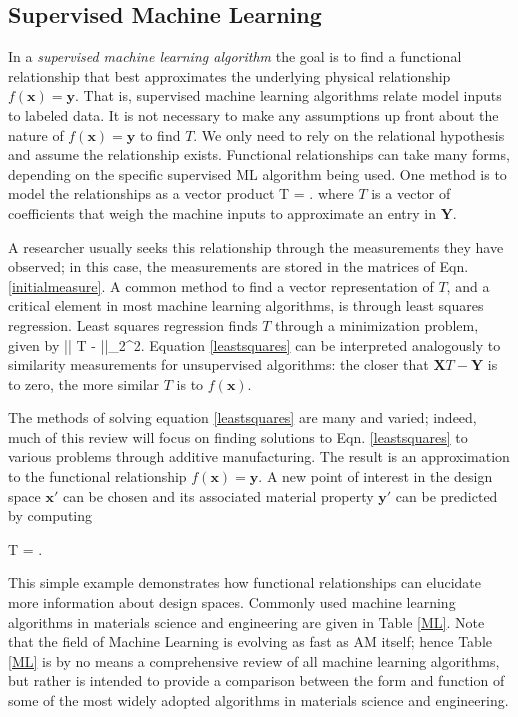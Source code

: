 \subsection{Supervised Machine Learning}
In a \textit{supervised machine learning algorithm} the goal is to find a functional relationship that best approximates the underlying physical relationship $f(\mathbf{x}) = \mathbf{y}$. That is, supervised machine learning algorithms relate model inputs to labeled data. It is not necessary to make any assumptions up front about the nature of $f(\mathbf{x}) = \mathbf{y}$ to find $T$. We only need to rely on the relational hypothesis and assume the relationship exists.
Functional relationships can take many forms, depending on the specific supervised ML algorithm being used. One method is to model the relationships as a vector product 
\eqn
{}T = .
\label{map}
\equ
where $T$ is a vector of coefficients that weigh the machine inputs to approximate an entry in $\mathbf{Y}$. 

A researcher usually seeks this relationship through the measurements they have observed; in this case, the measurements are stored in the matrices of Eqn. \ref{initialmeasure}.
A common method to find a vector representation of $T$, and a critical element in most machine learning algorithms, is through least squares regression. Least squares regression finds $T$ through a minimization problem, given by
\eqn
\min || T -  ||_{2}^{2}.
\label{leastsquares}
\equ
Equation \ref{leastsquares} can be interpreted analogously to similarity measurements for unsupervised algorithms: the closer that $\mathbf{X}T - \mathbf{Y}$ is to zero, the more similar $T$ is to $f(\mathbf{x})$.

The methods of solving equation \ref{leastsquares} are many and varied; indeed, much of this review will focus on finding solutions to Eqn. \ref{leastsquares} to various problems through additive manufacturing.
The result is an approximation to the functional relationship $f(\mathbf{x}) = \mathbf{y}$.
A new point of interest in the design space $\mathbf{x'}$ can be chosen and its associated material property $\mathbf{y'}$ can be predicted by computing

\eqn
{}T = .
\equ

This simple example demonstrates how functional relationships can elucidate more information about design spaces.
Commonly used machine learning algorithms in materials science and engineering are given in Table \ref{ML}.
Note that the field of Machine Learning is evolving as fast as AM itself; hence Table \ref{ML} is by no means a comprehensive review of all machine learning algorithms, but rather is intended to provide a comparison between the form and function of some of the most widely adopted algorithms in materials science and engineering.


